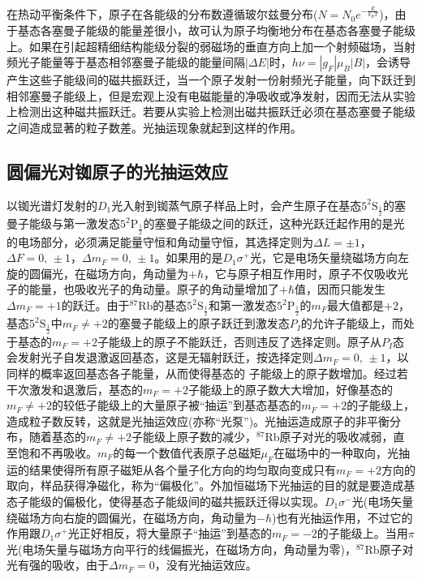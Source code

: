 \documentclass[a4paper]{article}
\begin{document}
在热动平衡条件下，原子在各能级的分布数遵循玻尔兹曼分布($N = N_0e^{-\frac{E}{k_BT}}$)，由于基态各塞曼子能级的能量差很小，故可认为原子均衡地分布在基态各塞曼子能级上。如果在引起超精细结构能级分裂的弱磁场的垂直方向上加一个射频磁场，当射频光子能量等于基态相邻塞曼子能级的能量间隔$|\Delta E|$时，$h\nu = |g_F|\mu_B|B|$，会诱导产生这些子能级间的磁共振跃迁，当一个原子发射一份射频光子能量，向下跃迁到相邻塞曼子能级上，但是宏观上没有电磁能量的净吸收或净发射，因而无法从实验上检测出这种磁共振跃迁。若要从实验上检测出磁共振跃迁必须在基态塞曼子能级之间造成显著的粒子数差。光抽运现象就起到这样的作用。
\subsection{圆偏光对铷原子的光抽运效应}
以铷光谱灯发射的$D_1$光入射到铷蒸气原子样品上时，会产生原子在基态$5^2\text{S}_{\frac{1}{2}}$的塞曼子能级与第一激发态$5^2\text{P}_{\frac{1}{2}}$的塞曼子能级之间的跃迁，这种光跃迁起作用的是光的电场部分，必须满足能量守恒和角动量守恒，其选择定则为$\Delta L = \pm 1$，$\Delta F = 0\text{, }\pm 1$，$\Delta m_F = 0\text{, }\pm 1$。如果用的是$D_1\sigma^{+}$光，它是电场矢量绕磁场方向左旋的圆偏光，在磁场方向，角动量为$+\hbar$，它与原子相互作用时，原子不仅吸收光子的能量，也吸收光子的角动量。原子的角动量增加了$+\hbar$值，因而只能发生 $\Delta m_F = +1$的跃迁。由于$^{87}$Rb的基态$5^2\text{S}_{\frac{1}{2}}$和第一激发态$5^2\text{P}_{\frac{1}{2}}$的$m_F$最大值都是$+2$，基态$5^2\text{S}_{\frac{1}{2}}$中$m_F\neq +2$的塞曼子能级上的原子跃迁到激发态$P_I$的允许子能级上，而处于基态的$m_F= +2$子能级上的原子不能跃迁，否则违反了选择定则。原子从$P_I$态会发射光子自发退激返回基态，这是无辐射跃迁，按选择定则$\Delta m_F = 0\text{, }\pm 1$，以同样的概率返回基态各子能量，从而使得基态的 子能级上的原子数增加。经过若干次激发和退激后，基态的$m_F = +2$子能级上的原子数大大增加，好像基态的$m_F\neq +2$的较低子能级上的大量原子被“抽运”到基态基态的$m_F = +2$的子能级上，造成粒子数反转，这就是光抽运效应(亦称“光泵”)。光抽运造成原子的非平衡分布，随着基态的$m_F\neq +2$子能级上原子数的减少，$^{87}$Rb原子对光的吸收减弱，直至饱和不再吸收。$m_F$的每一个数值代表原子总磁矩$\mu_F$在磁场中的一种取向，光抽运的结果使得所有原子磁矩从各个量子化方向的均匀取向变成只有$m_F = +2$方向的取向，样品获得净磁化，称为“偏极化”。外加恒磁场下光抽运的目的就是要造成基态子能级的偏极化，使得基态子能级间的磁共振跃迁得以实现。$D_1\sigma^{-}$光(电场矢量绕磁场方向右旋的圆偏光，在磁场方向，角动量为$-\hbar$)也有光抽运作用，不过它的作用跟$D_1\sigma^{+}$光正好相反，将大量原子“抽运”到基态的$m_F = -2$的子能级上。当用$\pi$光(电场矢量与磁场方向平行的线偏振光，在磁场方向，角动量为零)，$^{87}$Rb原子对光有强的吸收，由于$\Delta m_F = 0$，没有光抽运效应。
\end{document}
